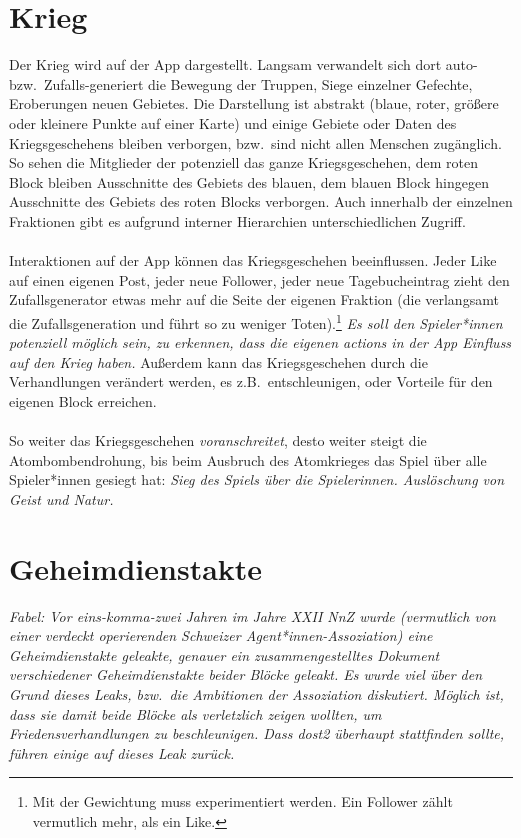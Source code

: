 \section{Krieg}
Der Krieg wird auf der App dargestellt. 
Langsam verwandelt sich dort auto- bzw.~Zufalls-generiert die Bewegung der
Truppen, Siege einzelner Gefechte, Eroberungen neuen Gebietes. 
Die Darstellung ist abstrakt (blaue, roter, größere oder kleinere Punkte auf
einer Karte) und einige Gebiete oder Daten des Kriegsgeschehens bleiben
verborgen, bzw.~sind nicht allen Menschen zugänglich. 
So sehen die Mitglieder der  potenziell das ganze
Kriegsgeschehen, dem roten Block bleiben Ausschnitte des Gebiets des blauen, dem
blauen Block hingegen Ausschnitte des Gebiets des roten Blocks verborgen. Auch
innerhalb der einzelnen Fraktionen gibt es aufgrund interner Hierarchien
unterschiedlichen Zugriff.\\\\
%
Interaktionen auf der App können das Kriegsgeschehen beeinflussen. 
Jeder Like auf einen eigenen Post, jeder neue Follower, jeder neue
Tagebucheintrag zieht den Zufallsgenerator etwas mehr auf die Seite der eigenen
Fraktion (die  verlangsamt die Zufallsgeneration und führt so zu
weniger Toten).\footnote{
  Mit der Gewichtung muss experimentiert werden. Ein Follower zählt vermutlich
  mehr, als ein Like.
}
\emph{Es soll den Spieler*innen potenziell möglich sein, zu erkennen, dass die
eigenen actions in der App Einfluss auf den Krieg haben.}
Außerdem kann das Kriegsgeschehen durch die Verhandlungen verändert werden,
es z.B.~entschleunigen, oder Vorteile für den eigenen Block erreichen.\\\\
% 
So weiter das Kriegsgeschehen \emph{voranschreitet}, desto weiter steigt die
Atombombendrohung, bis beim Ausbruch des Atomkrieges das Spiel über alle
Spieler*innen gesiegt hat: \emph{Sieg des Spiels über die Spielerinnen.
Auslöschung von Geist und Natur.}

\section{Geheimdienstakte}\label{sec:geheimdienstakte}

\emph{Fabel: Vor eins-komma-zwei Jahren im Jahre XXII NnZ wurde (vermutlich von
einer verdeckt operierenden Schweizer Agent*innen-Assoziation) eine
Geheimdienstakte geleakte, genauer ein zusammengestelltes Dokument verschiedener
Geheimdienstakte beider Blöcke geleakt. Es wurde viel über den Grund dieses
Leaks, bzw.~die Ambitionen der Assoziation diskutiert. Möglich ist, dass sie
damit beide Blöcke als verletzlich zeigen wollten, um Friedensverhandlungen zu
beschleunigen. Dass \ac{dost2} überhaupt stattfinden sollte, führen einige auf
dieses Leak zurück.}
